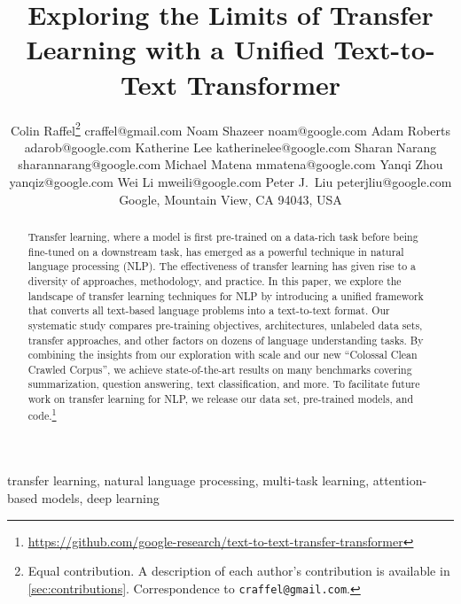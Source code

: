 \documentclass[twoside,11pt]{article}
\begin{document}
\title{Exploring the Limits of Transfer Learning with a Unified Text-to-Text Transformer}

\author{\name Colin Raffel\thanks{Equal contribution. A description of each author's contribution is available in \cref{sec:contributions}. Correspondence to \texttt{craffel@gmail.com}.} \email craffel@gmail.com
  \AND
  \name Noam Shazeer \email noam@google.com
  \AND
  \name Adam Roberts \email adarob@google.com
  \AND
  \name Katherine Lee \email katherinelee@google.com
  \AND
  \name Sharan Narang \email sharannarang@google.com
  \AND
  \name Michael Matena \email mmatena@google.com
  \AND
  \name Yanqi Zhou \email yanqiz@google.com
  \AND
  Wei Li \email mweili@google.com
  \AND
  \name Peter J.\ Liu \email peterjliu@google.com
  \AND \addr Google, Mountain View, CA 94043, USA
}


\maketitle

\begin{abstract}Transfer learning, where a model is first pre-trained on a data-rich task before being fine-tuned on a downstream task, has emerged as a powerful technique in natural language processing (NLP).
The effectiveness of transfer learning has given rise to a diversity of approaches, methodology, and practice.
In this paper, we explore the landscape of transfer learning techniques for NLP by introducing a unified framework that converts all text-based language problems into a text-to-text format.
Our systematic study compares pre-training objectives, architectures, unlabeled data sets, transfer approaches, and other factors on dozens of language understanding tasks.
By combining the insights from our exploration with scale and our new ``Colossal Clean Crawled Corpus'', we achieve state-of-the-art results on many benchmarks covering summarization, question answering, text classification, and more.
To facilitate future work on transfer learning for NLP, we release our data set, pre-trained models, and code.\footnote{\label{fn:oss}\url{https://github.com/google-research/text-to-text-transfer-transformer}}
\end{abstract}

\begin{keywords}
  transfer learning, natural language processing, multi-task learning, attention-based models, deep learning
\end{keywords}
\end{document}
